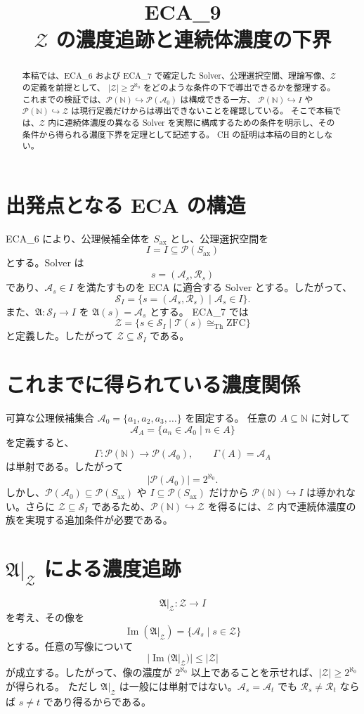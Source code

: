 \documentclass[a4paper,11pt]{jsarticle}
\title{ECA_9\\$\mathcal{Z}$ の濃度追跡と連続体濃度の下界}
\author{}
\date{}
\newcommand{\Solver}{\mathcal{S}}
\newcommand{\Sel}{I}
\newcommand{\Ax}{S_{\mathrm{ax}}}
\newcommand{\Pow}{\mathcal{P}}
\begin{document}
\maketitle
\begin{abstract}
本稿では、ECA_6 および ECA_7 で確定した Solver、公理選択空間、理論写像、$\mathcal{Z}$ の定義を前提として、
$|\mathcal{Z}|\geq 2^{\aleph_0}$ をどのような条件の下で導出できるかを整理する。
これまでの検証では、$\mathcal{P}(\mathbb{N})\hookrightarrow\mathcal{P}(\mathcal{A}_0)$ は構成できる一方、
$\mathcal{P}(\mathbb{N})\hookrightarrow I$ や $\mathcal{P}(\mathbb{N})\hookrightarrow\mathcal{Z}$ は現行定義だけからは導出できないことを確認している。
そこで本稿では、$\mathcal{Z}$ 内に連続体濃度の異なる Solver を実際に構成するための条件を明示し、その条件から得られる濃度下界を定理として記述する。
CH の証明は本稿の目的としない。
\end{abstract}
\section{出発点となる ECA の構造}
ECA_6 により、公理候補全体を $\Ax$ とし、公理選択空間を
\[
\Sel=I\subseteq\Pow(\Ax)
\]
とする。Solver は
\[
\boxed{s=(\mathcal{A}_s,\mathcal{R}_s)}
\]
であり、$\mathcal{A}_s\in I$ を満たすものを ECA に適合する Solver とする。したがって、
\[
\Solver_I=\{s=(\mathcal{A}_s,\mathcal{R}_s)\mid\mathcal{A}_s\in I\}.
\]
また、$\mathfrak{A}:\Solver_I\to I$ を $\mathfrak{A}(s)=\mathcal{A}_s$ とする。
ECA_7 では
\[
\boxed{\mathcal{Z}=\{s\in\Solver_I\mid\mathcal{T}(s)\cong_{\mathrm{Th}}\mathrm{ZFC}\}}
\]
と定義した。したがって $\mathcal{Z}\subseteq\Solver_I$ である。
\section{これまでに得られている濃度関係}
可算な公理候補集合 $\mathcal{A}_0=\{a_1,a_2,a_3,\ldots\}$ を固定する。
任意の $A\subseteq\mathbb{N}$ に対して
\[
\mathcal{A}_A=\{a_n\in\mathcal{A}_0\mid n\in A\}
\]
を定義すると、
\[
\Gamma:\Pow(\mathbb{N})\to\Pow(\mathcal{A}_0),\qquad \Gamma(A)=\mathcal{A}_A
\]
は単射である。したがって
\[
|\Pow(\mathcal{A}_0)|=2^{\aleph_0}.
\]
しかし、$\Pow(\mathcal{A}_0)\subseteq\Pow(\Ax)$ や $I\subseteq\Pow(\Ax)$ だけから $\Pow(\mathbb{N})\hookrightarrow I$ は導かれない。さらに $\mathcal{Z}\subseteq\Solver_I$ であるため、$\Pow(\mathbb{N})\hookrightarrow\mathcal{Z}$ を得るには、$\mathcal{Z}$ 内で連続体濃度の族を実現する追加条件が必要である。
\section{$\mathfrak{A}|_{\mathcal{Z}}$ による濃度追跡}
\[
\boxed{\mathfrak{A}|_{\mathcal{Z}}:\mathcal{Z}\to I}
\]
を考え、その像を
\[
\operatorname{Im}(\mathfrak{A}|_{\mathcal{Z}})=\{\mathcal{A}_s\mid s\in\mathcal{Z}\}
\]
とする。任意の写像について
\[
|\operatorname{Im}(\mathfrak{A}|_{\mathcal{Z}})|\leq|\mathcal{Z}|
\]
が成立する。したがって、像の濃度が $2^{\aleph_0}$ 以上であることを示せれば、$|\mathcal{Z}|\geq2^{\aleph_0}$ が得られる。
ただし $\mathfrak{A}|_{\mathcal{Z}}$ は一般には単射ではない。$\mathcal{A}_s=\mathcal{A}_t$ でも $\mathcal{R}_s\neq\mathcal{R}_t$ ならば $s\neq t$ であり得るからである。
\end{document}
